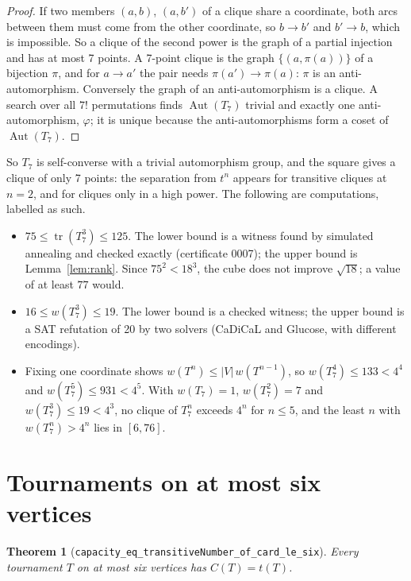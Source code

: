 \documentclass[11pt]{article}
\newtheorem{theorem}{Theorem}
\theoremstyle{definition}
\theoremstyle{remark}
\newcommand{\tr}{\operatorname{tr}}
\newcommand{\Aut}{\operatorname{Aut}}
\begin{document}
\begin{proof}
If two members $(a, b)$, $(a, b')$ of a clique share a coordinate, both arcs between them must
come from the other coordinate, so $b \to b'$ and $b' \to b$, which is impossible. So a clique of
the second power is the graph of a partial injection and has at most 7 points. A 7-point clique is
the graph $\{(a, \pi(a))\}$ of a bijection $\pi$, and for $a \to a'$ the pair needs
$\pi(a') \to \pi(a)$: $\pi$ is an anti-automorphism. Conversely the graph of an anti-automorphism
is a clique. A search over all $7!$ permutations finds $\Aut(T_7)$ trivial and exactly one
anti-automorphism, $\varphi$; it is unique because the anti-automorphisms form a coset of
$\Aut(T_7)$.
\end{proof}

So $T_7$ is self-converse with a trivial automorphism group, and the square gives a clique of only 7
points: the separation from $t^n$ appears for transitive cliques at $n = 2$, and for cliques only
in a high power. The following are computations, labelled as such.
\begin{itemize}
\item $75 \le \tr(T_7^3) \le 125$. The lower bound is a witness found by simulated annealing and
checked exactly (certificate 0007); the upper bound is Lemma~\ref{lem:rank}. Since
$75^2 < 18^3$, the cube does not improve $\sqrt{18}$; a value of at least $77$ would.
\item $16 \le w(T_7^3) \le 19$. The lower bound is a checked witness; the upper bound is a SAT
refutation of 20 by two solvers (CaDiCaL and Glucose, with different encodings).
\item Fixing one coordinate shows $w(T^n) \le |V|\, w(T^{n-1})$, so $w(T_7^4) \le 133 < 4^4$ and
$w(T_7^5) \le 931 < 4^5$. With $w(T_7) = 1$, $w(T_7^2) = 7$ and $w(T_7^3) \le 19 < 4^3$, no clique of
$T_7^n$ exceeds $4^n$ for $n \le 5$, and the least $n$ with $w(T_7^n) > 4^n$ lies in $[6, 76]$.
\end{itemize}

\section{Tournaments on at most six vertices}\label{sec:six}

\begin{theorem}[\texttt{capacity\_eq\_transitiveNumber\_of\_card\_le\_six}]\label{thm:six}
Every tournament $T$ on at most six vertices has $C(T) = t(T)$.
\end{theorem}
\end{document}
